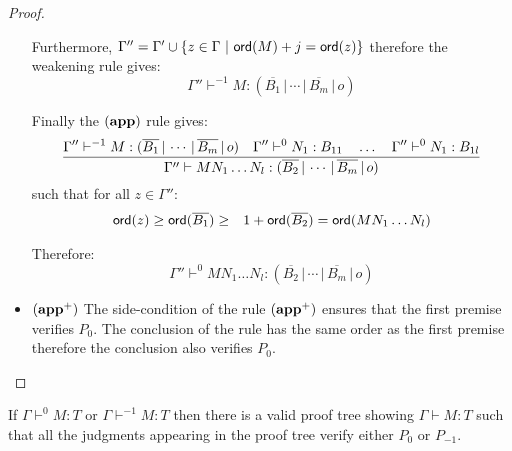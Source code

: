 \begin{proof}
\begin{itemize}
    Furthermore, $\Gamma'' = \Gamma' \union \{ z \in \Gamma \ | \ \ord{M} + j = \ord{z}\}$ therefore
    the weakening rule gives:
    $$\Gamma'' \vdash^{-1} M : (\overline{B_1} \, | \, \cdots \, | \, \overline{B_m} \, | \, o)$$

    Finally the $\mathbf{(app)}$ rule gives:
    $$\frac{\displaystyle \Gamma'' \vdash^{-1} M : (\overline{B_1} \, | \, \cdots \, | \, \overline{B_m} \, | \, o)
    \quad \Gamma'' \vdash^0 N_1 : B_{11} \quad \ldots \quad \Gamma'' \vdash^0 N_1 : B_{1l}
    }{ \Gamma'' \vdash M N_1 \ldots N_l : (\overline{B_2} \, | \, \cdots \, | \,
            \overline{B_m} \, | \, o)}
    $$
    such that for all $z\in \Gamma''$:
    \begin{eqnarray*}
    {\sf ord}(z) \geq {\sf ord}(\overline{B_1})
    &\geq& 1 + {\sf ord}(\overline{B_2}) = {\sf ord}(M N_1 \ldots N_l)
    \end{eqnarray*}

    Therefore:
    $$\Gamma'' \vdash^0 M N_1 \ldots N_l : (\overline{B_2} \, | \, \cdots \, | \,
            \overline{B_m} \, | \, o)$$

\item $\mathbf{(app^+)}$  The side-condition of the rule $\mathbf{(app^+)}$ ensures that the first premise
 verifies $P_0$. The conclusion of the rule has the same order as the first premise
 therefore the conclusion also verifies $P_0$.
\end{itemize}
\end{proof}


\begin{lem}
\label{lem:prooftree01only} If $\Gamma \vdash^{0} M : T$ or $\Gamma
\vdash^{-1} M : T$ then there is a valid proof tree showing $\Gamma
\vdash M : T$ such that all the judgments appearing in the proof
tree verify either $P_0$ or $P_{-1}$.
\end{lem}


